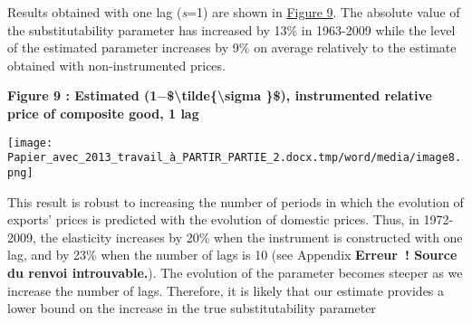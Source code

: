 \documentclass[12pt,twoside,a4paper,notitlepage]{article}
\begin{document}
Results obtained with one lag (\textit{s}=1) are shown in {\hyperref[ref-010]{Figure 9}}. The absolute value of the substitutability parameter has increased by 13\% in 1963-2009 while the level of the estimated parameter increases by 9\% on average relatively to the estimate obtained with non-instrumented prices. 

\textbf{ \label{ref-010}Figure 9 : Estimated (1${-}$\$\textbackslash tilde\{\textbackslash sigma \}\$), instrumented relative price of composite good, 1 lag}

\texttt{[image: Papier\_avec\_2013\_travail\_à\_PARTIR\_PARTIE\_2.docx.tmp/word/media/image8.png]} 

This result is robust to increasing the number of periods in which the evolution of exports' prices is predicted with the evolution of domestic prices. Thus, in 1972-2009, the elasticity increases by 20\% when the instrument is constructed with one lag, and by 23\% when the number of lags is 10 (see Appendix \textbf{Erreur~! Source du renvoi introuvable.}). The evolution of the parameter becomes steeper as we increase the number of lags. Therefore, it is likely that our estimate provides a lower bound on the increase in the true substitutability parameter%
\end{document}
